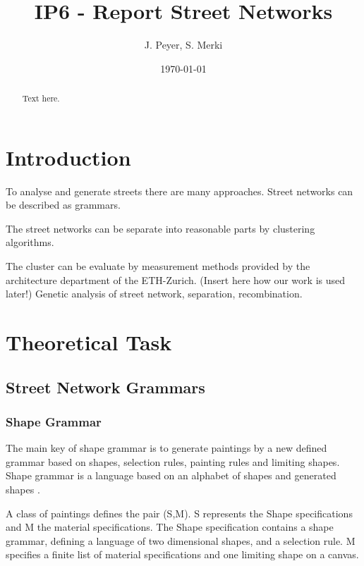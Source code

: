 \documentclass[11pt, a4paper]{report}
\begin{document}
\begin{titlepage}
    \title{IP6 - Report Street Networks}
    \date{\today}
    \author{J. Peyer, S. Merki}
    \maketitle
\end{titlepage}
\setcounter{page}{1}

\tableofcontents


\begin{abstract}
    Text here.
\end{abstract}

\chapter{Introduction}
To analyse and generate streets there are many approaches. Street networks can be described as grammars. 

The street networks can be separate into reasonable parts by clustering algorithms. 

The cluster can be evaluate by measurement methods provided by the architecture department of the ETH-Zurich. 
(Insert here how our work is used later!)
Genetic analysis of street network, separation, recombination.
\chapter{Theoretical Task}
\section{Street Network Grammars}
\subsection{Shape Grammar}
The main key of shape grammar is to generate paintings by a new defined grammar based on shapes, selection rules, painting rules and limiting shapes. Shape grammar is a language based on an alphabet of shapes and generated shapes \citep{shapeGrammars:1972}. 

A class of paintings defines the pair (S,M). S represents the Shape specifications and M the material specifications. The Shape specification contains a shape grammar, defining a language of two dimensional shapes, and a selection rule. M specifies a finite list of material specifications and one limiting shape on a canvas.
\end{document}
